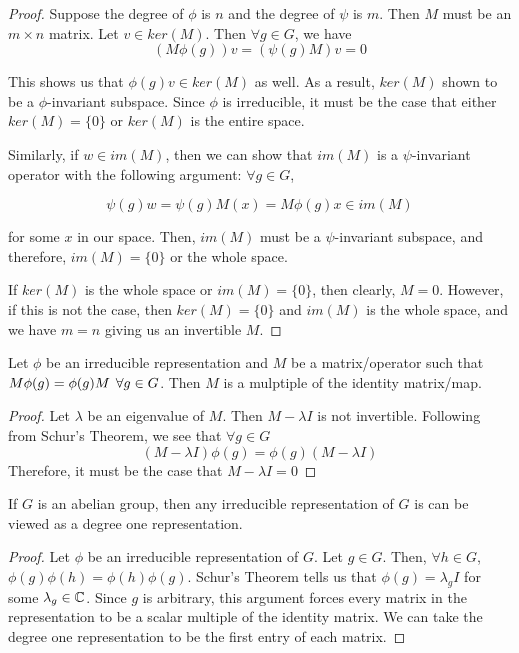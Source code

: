 \begin{proof}Suppose the degree of $\phi$ is $n$ and the degree of $\psi$ is $m$. Then $M$ must be an $m\times n$ matrix. Let $v\in ker(M)$. Then $\forall g \in G$, we have 
\begin{equation}
	 (M\phi(g))v= (\psi(g)M)v = 0
\end{equation}

This shows us that $\phi(g)v \in ker(M)$ as well. As a result, $ker(M)$ shown to be a $\phi$-invariant subspace. Since $\phi$ is irreducible, it must be the case that either $ker(M) =\{0\}$ or $ker(M)$ is the entire space.  

Similarly, if $w \in im(M)$, then we can show that $im(M)$ is a $\psi$-invariant operator with the following argument: $\forall g\in G$,

\begin{equation}
	\psi(g)w =\psi(g)M(x) = M\phi(g)x \in im(M)
\end{equation}

for some $x$ in our space. Then, $im(M)$ must be a $\psi$-invariant subspace, and therefore, $im(M) = \{0\}$ or the whole space.

If $ker(M)$ is the whole space or $im(M) = \{0\}$, then clearly, $M=0$. However, if this is not the case, then $ker(M) = \{0\}$ and $im(M)$ is the whole space, and we have $m=n$ giving us an invertible $M$. \end{proof}

\begin{corrolary}
	Let $\phi$ be an irreducible representation and $M$ be a matrix/operator such that $M\phi(g)=\phi(g)M \hspace{1.5mm}\forall g \in G$. Then $M$ is a mulptiple of the identity matrix/map.
\end{corrolary}

\begin{proof}\cite{Mendes} Let $\lambda$ be an eigenvalue of $M$. Then $M - \lambda I$ is not invertible. Following from Schur's Theorem, we see that $\forall g \in G$
$$(M-\lambda I)\phi(g) = \phi(g) (M-\lambda I)$$
Therefore, it must be the case that $M-\lambda I = 0$ \end{proof}

\begin{corrolary}
	If $G$ is an abelian group, then any irreducible representation of $G$ is can be viewed as a degree one representation.
\end{corrolary}

\begin{proof}\cite{Tung} Let $\phi$ be an irreducible representation of $G$. Let $g \in G$. Then, $\forall h \in G$, $\phi(g)\phi(h) = \phi(h)\phi(g)$. Schur's Theorem tells us that $\phi(g) = \lambda_g I$ for some $\lambda_g \in \mathbb{C}$. Since $g$ is arbitrary, this argument forces every matrix in the representation to be a scalar multiple of the identity matrix. We can take the degree one representation to be the first entry of each matrix.  \end{proof}

